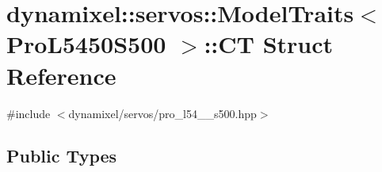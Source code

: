 \hypertarget{structdynamixel_1_1servos_1_1_model_traits_3_01_pro_l5450_s500_01_4_1_1_c_t}{}\section{dynamixel\+:\+:servos\+:\+:Model\+Traits$<$ Pro\+L5450\+S500 $>$\+:\+:CT Struct Reference}
\label{structdynamixel_1_1servos_1_1_model_traits_3_01_pro_l5450_s500_01_4_1_1_c_t}


{\ttfamily \#include $<$dynamixel/servos/pro\+\_\+l54\+\_\+\_\+s500.\+hpp$>$}

\subsection*{Public Types}

